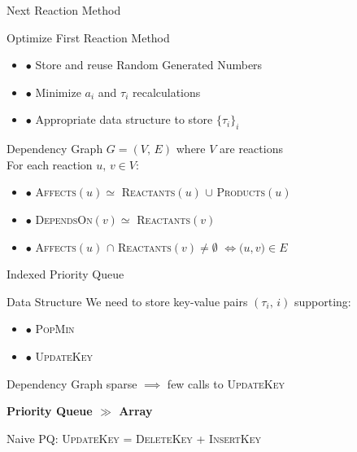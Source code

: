 \documentclass{beamer}
\begin{document}
\begin{frame}{Next Reaction Method}
  \begin{block}{Optimize First Reaction Method}
    \begin{itemize}
    \item $\bullet$ Store and reuse Random Generated Numbers
    \item $\bullet$ Minimize $a_i$ and $\tau_i$ recalculations
    \item $\bullet$ Appropriate data structure to store $\bigl\{\tau_i\bigr\}_i$
    \end{itemize}
  \end{block}
  \begin{block}{Dependency Graph}
    $G=\left(V,\, E\right)$ where $V$ are reactions \\
    \vspace{2pt}
    For each reaction $u,\, v \in V$:
    \begin{itemize}
    \item $\bullet$ \textsc{Affects}$(u) \simeq $ \textsc{Reactants}$(u)$ $\cup$ \textsc{Products}$(u)$
    \item $\bullet$ \textsc{DependsOn}$(v) \simeq $ \textsc{Reactants}$(v)$
    \item $\bullet$ \textsc{Affects}$(u)$ $\cap$
      \textsc{Reactants}$(v) \neq \emptyset$ $\iff \bigl(u, v \bigr) \in E$   
    \end{itemize}    
  \end{block}
\end{frame}

\begin{frame}{Indexed Priority Queue}
  \begin{block}{Data Structure}
    We need to store key-value pairs $\left(\tau_i,\, i\right)$ supporting:
    \begin{itemize}
    \item $\bullet$ \textsc{PopMin}
    \item $\bullet$ \textsc{UpdateKey}
    \end{itemize}
  \end{block}
  \vspace{5pt}
  Dependency Graph sparse $\implies$ few calls to \textsc{UpdateKey}
  \begin{center}
    \textbf{Priority Queue $\pmb{\gg}$ Array}
  \end{center}
  Naive PQ: \textsc{UpdateKey} = \textsc{DeleteKey} + \textsc{InsertKey}
\end{frame}
\end{document}
